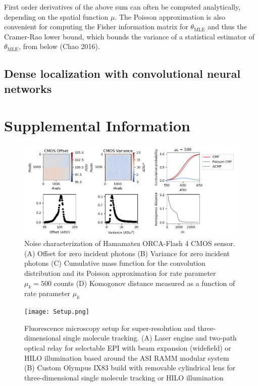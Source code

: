 \documentclass{ucetd}
\begin{document}
First order derivatives of the above sum can often be computed analytically, depending on the spatial function $\mu$. The Poisson approximation is also convenient for computing the Fisher information matrix for $\theta_{\mathrm{MLE}}$ and thus the Cramer-Rao lower bound, which bounds the variance of a statistical estimator of $\theta_{\mathrm{MLE}}$, from below (Chao 2016).

\subsection{Dense localization with convolutional neural networks}

\section{Supplemental Information}

\begin{figure}
\begin{center}
\includegraphics[width=16cm]{Noise.png}
\end{center}
\caption{Noise characterization of Hamamatsu ORCA-Flash 4 CMOS sensor. (A) Offset for zero incident photons (B) Variance for zero incident photons (C) Cumulative mass function for the convolution distribution and its Poisson approximation for rate parameter $\mu_{k} = 500$ counts (D) Komogonov distance measured as a function of rate parameter $\mu_{k}$}
\end{figure}

\begin{figure}
\begin{center}
\texttt{[image: Setup.png]}
\end{center}


\caption{Fluorescence microscopy setup for super-resolution and three-dimensional single molecule tracking. (A) Laser engine and two-path optical relay for selectable EPI with beam expansion (widefield) or HILO illumination based around the ASI RAMM modular system (B) Custom Olympus IX83 build with removable cylindrical lens for three-dimensional single molecule tracking or HILO illumination}
\end{figure}
\end{document}
